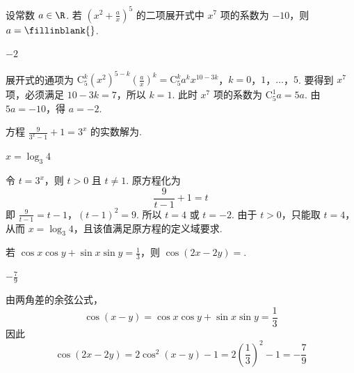 \begin{problem}
设常数 \(a \in \R\). 若 \(\left(x^2 + \frac{a}{x}\right)^5\) 的二项展开式中 \(x^7\) 项的系数为 \(-10\)，则 \(a =\fillinblank{}\).

\begin{answer}
\(-2\)
\end{answer}

\begin{solution}
展开式的通项为
\(\mathrm C_5^k(x^2)^{5-k}\left(\frac{a}{x}\right)^k=\mathrm C_5^k a^k x^{10-3k}\)，\(k=0\)，\(1\)，\(\ldots\)，\(5\).
要得到 \(x^7\) 项，必须满足 \(10-3k=7\)，所以 \(k=1\). 此时 \(x^7\) 项的系数为 \(\mathrm C_5^1a=5a\). 由 \(5a=-10\)，得 \(a=-2\).
\end{solution}
\end{problem}

\begin{problem}
方程 \(\frac{9}{3^x - 1} + 1 = 3^x\) 的实数解为\fillinblank{}.

\begin{answer}
\(x = \log_{3}4\)
\end{answer}

\begin{solution}
令 \(t=3^x\)，则 \(t>0\) 且 \(t\ne1\). 原方程化为
\[
\frac{9}{t-1}+1=t
\]
即
\(\frac{9}{t-1}=t-1\)，\((t-1)^2=9\).
所以 \(t=4\) 或 \(t=-2\). 由于 \(t>0\)，只能取 \(t=4\)，从而 \(x=\log_3 4\)，且该值满足原方程的定义域要求.
\end{solution}
\end{problem}

\begin{problem}
若 \(\cos x\cos y+\sin x\sin y=\frac{1}{3}\)，则 \(\cos\left(2x-2y\right)=\)\fillinblank{}.

\begin{answer}
\(-\frac{7}{9}\)
\end{answer}

\begin{solution}
由两角差的余弦公式，
\[
\cos(x-y)=\cos x\cos y+\sin x\sin y=\frac{1}{3}
\]
因此
\[
\cos(2x-2y)=2\cos^2(x-y)-1=2\left(\frac{1}{3}\right)^2-1=-\frac{7}{9}
\]
\end{solution}
\end{problem}

